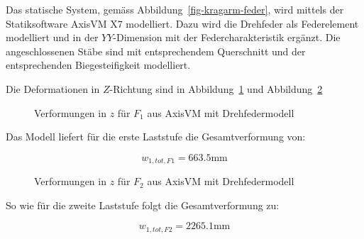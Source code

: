 \documentclass[
  10pt,
  letterpaper,
]{scrreprt}
\begin{document}
Das statische System, gemäss Abbildung~\ref{fig-kragarm-feder}, wird
mittels der Statiksoftware AxisVM X7 modelliert. Dazu wird die Drehfeder
als Federelement modelliert und in der \(YY\)-Dimension mit der
Federcharakteristik ergänzt. Die angeschlossenen Stäbe sind mit
entsprechendem Querschnitt und der entsprechenden Biegesteifigkeit
modelliert.

Die Deformationen in \(Z\)-Richtung sind in
Abbildung~\ref{fig-kragarm-drehfeder-10} und
Abbildung~\ref{fig-kragarm-drehfeder-215}

\begin{figure}[H]


\caption{\label{fig-kragarm-drehfeder-10}Verformungen in \(z\) für
\(F_1\) aus AxisVM mit Drehfedermodell}

\end{figure}%

Das Modell liefert für die erste Laststufe die Gesamtverformung von:

\[
w_{1,tot,F1} = 663.5 \text{mm}
\]

\begin{figure}[H]


\caption{\label{fig-kragarm-drehfeder-215}Verformungen in \(z\) für
\(F_2\) aus AxisVM mit Drehfedermodell}

\end{figure}%

So wie für die zweite Laststufe folgt die Gesamtverformung zu:

\[
w_{1,tot,F2} = 2265.1 \text{mm}
\]
\end{document}
